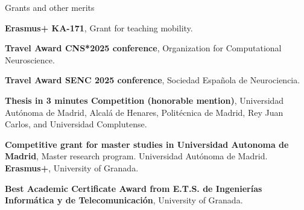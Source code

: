 \begin{rubric}{Grants and other merits}

\entry*[December 2025] \textbf{Erasmus+ KA-171}, Grant for teaching mobility.

\entry*[2025] \textbf{Travel Award CNS*2025 conference}, Organization for Computational Neuroscience. 

\entry*[2025] \textbf{Travel Award SENC 2025 conference}, Sociedad Española de Neurociencia.


\entry*[June 2022] \textbf{Thesis in 3 minutes Competition (honorable mention)}, Universidad Autónoma de Madrid, Alcalá de Henares, Politécnica de Madrid, Rey Juan Carlos, and Universidad Complutense.


\entry*[2018-2019] \textbf{Competitive grant for master studies in Universidad Autonoma de Madrid}, Master research program. Universidad Autónoma de Madrid.
%
\entry*[2016-2017] \textbf{Erasmus+}, University of Granada.

\entry*[2016] \textbf{Best Academic Certificate Award from E.T.S. de Ingenierías Informática y de Telecomunicación}, University of Granada.

\end{rubric}